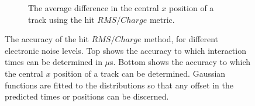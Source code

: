 \begin{figure}
\begin{subfigure}{0.6\textwidth}
    \caption{The average difference in the central $x$ position of a track using the hit $RMS/Charge$ metric.}
    \label{fig:DiffNoiseStudy_AvDiff_RMS_Int_X}
  \end{subfigure}
  \caption[Comparing the accuracy of the hit $RMS$ method, as the electronic noise level changes]
          {The accuracy of the hit $RMS/Charge$ method, for different electronic noise levels. Top shows the accuracy to which interaction times can be determined in $\mu$s. Bottom shows the accuracy to which the central $x$ position of a track can be determined. Gaussian functions are fitted to the distributions so that any offset in the predicted times or positions can be discerned.}
  \label{fig:DiffNoiseStudy_AvDiff_RMS_Int}
\end{figure}

